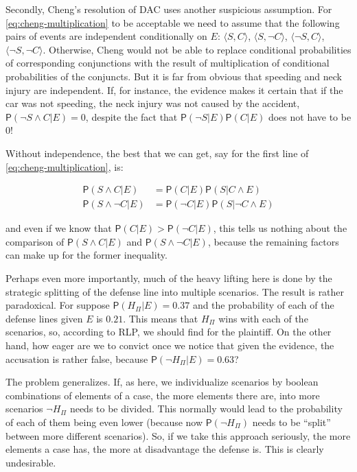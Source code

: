 \documentclass[10pt,dvipsnames,enabledeprecatedfontcommands]{scrartcl}
\newcommand{\ra}{\rangle}
\newcommand{\la}{\langle}
\newcommand{\n}{\neg}
\newcommand{\et}{\wedge}
\newcommand{\pr}[1]{\mathsf{P}(#1)}
\begin{document}
Secondly, Cheng's resolution of DAC uses another suspicious assumption.
For \eqref{eq:cheng-multiplication} to be acceptable we need to assume
that the following pairs of events are independent conditionally on
\(E\): \(\la S, C\ra\), \(\la S, \n C\ra\), \(\la \n S, C\ra\),
\(\la \n S, \n C\ra\). Otherwise, Cheng would not be able to replace
conditional probabilities of corresponding conjunctions with the result
of multiplication of conditional probabilities of the conjuncts. But it
is far from obvious that speeding and neck injury are independent. If,
for instance, the evidence makes it certain that if the car was not
speeding, the neck injury was not caused by the accident,
\(\pr{\n S\et C\vert E}=0\), despite the fact that
\(\pr{\n S \vert E}\pr{C\vert E}\) does not have to be \(0\)!

Without independence, the best that we can get, say for the first line
of \eqref{eq:cheng-multiplication}, is:

\begin{align*}
\pr{S\et C\vert E} & = \pr{C\vert E}\pr{S\vert C \et E}\\
\pr{S\et \n C\vert E} & = \pr{\n C\vert E}\pr{S\vert  \n C \et E}
\end{align*}

and even if we know that \(\pr{C\vert E}>\pr{\n C\vert E}\), this tells
us nothing about the comparison of \(\pr{S\et C\vert E}\) and
\(\pr{S\et \n C\vert E}\), because the remaining factors can make up for
the former inequality.

Perhaps even more importantly, much of the heavy lifting here is done by
the strategic splitting of the defense line into multiple scenarios. The
result is rather paradoxical. For suppose \(\pr{H_\Pi\vert E}=0.37\) and
the probability of each of the defense lines given \(E\) is \(0.21\).
This means that \(H_\Pi\) wins with each of the scenarios, so, according
to RLP, we should find for the plaintiff. On the other hand, how eager
are we to convict once we notice that given the evidence, the accusation
is rather false, because \(\pr{\n H_\Pi\vert E}=0.63\)?

The problem generalizes. If, as here, we individualize scenarios by
boolean combinations of elements of a case, the more elements there are,
into more scenarios \(\n H_\Pi\) needs to be divided. This normally
would lead to the probability of each of them being even lower (because
now \(\pr{\n H_\Pi}\) needs to be ``split'' between more different
scenarios). So, if we take this approach seriously, the more elements a
case has, the more at disadvantage the defense is. This is clearly
undesirable.
\end{document}
